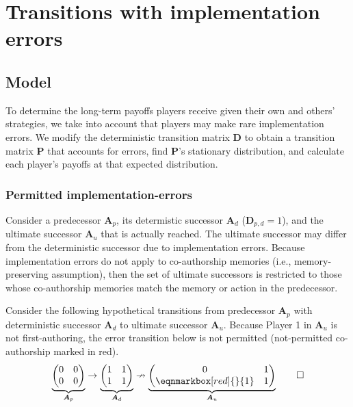 \documentclass[12pt]{article}
\begin{document}
\clearpage
\section{Transitions with implementation errors}

\subsection{Model}

To determine the long-term payoffs players receive 
given their own and others' strategies,
we take into account that players may make rare implementation errors.
We modify the deterministic transition matrix $\boldsymbol{D}$ to 
obtain a transition matrix $\boldsymbol{P}$ that accounts for errors,
find $\boldsymbol{P}$'s stationary distribution,
and calculate each player's payoffs at that expected distribution.

\subsubsection{Permitted implementation-errors}
\label{no_memory_errors}

Consider a predecessor $\boldsymbol{A}_{p}$,
its determistic successor $\boldsymbol{A}_{d}$ ($\boldsymbol{D}_{p, d} = 1$),
and the ultimate successor $\boldsymbol{A}_{u}$ that is actually reached.
The ultimate successor may differ from the deterministic successor due to implementation errors.
Because implementation errors do not apply to co-authorship memories (i.e., memory-preserving assumption),
then the set of ultimate successors is restricted to those whose co-authorship memories 
match the memory or action in the predecessor.

\begin{exm}
Consider the following hypothetical transitions
from predecessor $\boldsymbol{A}_{p}$ 
with deterministic successor $\boldsymbol{A}_{d}$
to ultimate successor $\boldsymbol{A}_{u}$.
Because Player 1 in $\boldsymbol{A}_{u}$ is not first-authoring,
the error transition below is not permitted (not-permitted co-authorship marked in red).
\begin{equation*}
\underbrace{\begin{pmatrix} 0 & 0 \\ 0 & 0 \\ \end{pmatrix}}_{\boldsymbol{A}_p}
\rightarrow
\underbrace{\begin{pmatrix} 1 & 1 \\ 1 & 1 \\ \end{pmatrix}}_{\boldsymbol{A}_d}
\nrightarrow
\underbrace{
    \begin{pmatrix} 0 & 1 \\ \eqnmarkbox[red]{}{1} & 1 \\ \end{pmatrix}
}_{\boldsymbol{A}_u}
\qedhere
\end{equation*}
\end{exm}
\end{document}
